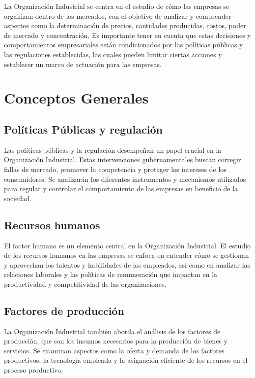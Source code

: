 \documentclass[
  doc,
  floatsintext,
  longtable,
  a4paper,
  nolmodern,
  notxfonts,
  notimes,
  12pt,
  colorlinks=true,linkcolor=blue,citecolor=blue,urlcolor=blue]{apa7}
\begin{document}
La Organización Industrial se centra en el estudio de cómo las empresas
se organizan dentro de los mercados, con el objetivo de analizar y
comprender aspectos como la determinación de precios, cantidades
producidas, costos, poder de mercado y concentración. Es importante
tener en cuenta que estas decisiones y comportamientos empresariales
están condicionados por las políticas públicas y las regulaciones
establecidas, las cuales pueden limitar ciertas acciones y establecer un
marco de actuación para las empresas.

\section{Conceptos Generales}\label{conceptos-generales}

\subsection{Políticas Públicas y
regulación}\label{poluxedticas-puxfablicas-y-regulaciuxf3n}

Las políticas públicas y la regulación desempeñan un papel crucial en la
Organización Industrial. Estas intervenciones gubernamentales buscan
corregir fallas de mercado, promover la competencia y proteger los
intereses de los consumidores. Se analizarán los diferentes instrumentos
y mecanismos utilizados para regular y controlar el comportamiento de
las empresas en beneficio de la sociedad.

\subsection{Recursos humanos}\label{recursos-humanos}

El factor humano es un elemento central en la Organización Industrial.
El estudio de los recursos humanos en las empresas se enfoca en entender
cómo se gestionan y aprovechan los talentos y habilidades de los
empleados, así como en analizar las relaciones laborales y las políticas
de remuneración que impactan en la productividad y competitividad de las
organizaciones.

\subsection{Factores de producción}\label{factores-de-producciuxf3n}

La Organización Industrial también aborda el análisis de los factores de
producción, que son los insumos necesarios para la producción de bienes
y servicios. Se examinan aspectos como la oferta y demanda de los
factores productivos, la tecnología empleada y la asignación eficiente
de los recursos en el proceso productivo.
\end{document}
